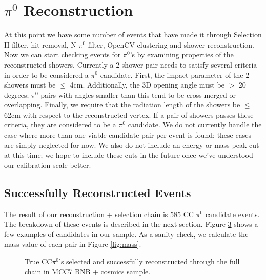 \documentclass[a4paper]{article}
\begin{document}
\section{$\pi^0$ Reconstruction}
\label{sec:pi0reco}
At this point we have some number of events that have made it through Selection II filter, hit removal, N-$\pi^0$ filter, OpenCV clustering and shower reconstruction. Now we can start checking events for $\pi^0$'s by examining properties of the reconstructed showers.  Currently a 2-shower pair needs to satisfy several criteria in order to be considered a $\pi^0$ candidate. First, the impact parameter of the 2 showers must be $\leq$ 4cm.  Additionally, the 3D opening angle must be $>$ 20 degrees; $\pi^0$ pairs with angles smaller than this tend to be cross-merged or overlapping. Finally, we require that the radiation length of the showers be $\leq$ 62cm with respect to the reconstructed vertex. If a pair of showers passes these criteria, they are considered to be a $\pi^0$ candidate. We do not currently handle the case where more than one viable candidate pair per event is found; these cases are simply neglected for now. We also do not include an energy or mass peak cut at this time; we hope to include these cuts in the future once we've understood our calibration scale better.

\subsection{Successfully Reconstructed Events}
The result of our reconstruction + selection chain is 585 CC $\pi^0$ candidate events. The breakdown of these events is described in the next section. Figure \ref{fig:ex2} shows a few examples of candidates in our sample. As a sanity check, we calculate the mass value of each pair in Figure \ref{fig:mass}. 

\begin{figure}[h!]
\centering
{}
\hspace{1 mm}
\label{fig:ex0}
\end{figure}
\begin{figure}[h!]
\centering
{}
\hspace{1 mm}
\hspace{1 mm}
\label{fig:ex2}
\end{figure}
\begin{figure}[h!]
\centering
{}
\hspace{1 mm}
\caption{True CC$\pi^0$'s selected and successfully reconstructed through the full chain in MCC7 BNB + cosmics sample. }
\label{fig:ex2}
\end{figure}
\end{document}
